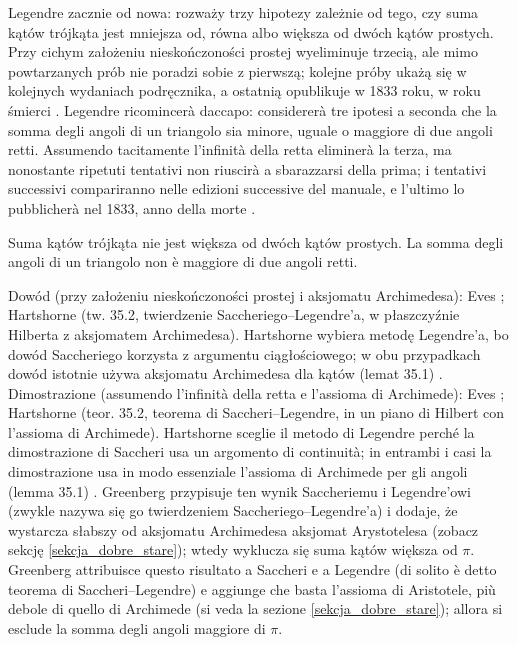 Legendre zacznie od nowa: rozważy trzy hipotezy zależnie od tego, czy suma kątów trójkąta jest mniejsza od, równa albo większa od dwóch kątów prostych. %
Przy cichym założeniu nieskończoności prostej wyeliminuje trzecią, ale mimo powtarzanych prób nie poradzi sobie z pierwszą; kolejne próby ukażą się w kolejnych wydaniach podręcznika, a ostatnią opublikuje w 1833 roku, w roku śmierci \cite[s. 286]{eves1_1972}. %
Legendre ricomincerà daccapo: considererà tre ipotesi a seconda che la somma degli angoli di un triangolo sia minore, uguale o maggiore di due angoli retti. %
Assumendo tacitamente l'infinità della retta eliminerà la terza, ma nonostante ripetuti tentativi non riuscirà a sbarazzarsi della prima; i tentativi successivi compariranno nelle edizioni successive del manuale, e l'ultimo lo pubblicherà nel 1833, anno della morte \cite[p. 286]{eves1_1972}. %

\begin{theorem}
[pierwsze twierdzenie Legendre'a] %
[primo teorema di Legendre] %
	Suma kątów trójkąta nie jest większa od dwóch kątów prostych. %
	La somma degli angoli di un triangolo non è maggiore di due angoli retti. %
\end{theorem}

Dowód (przy założeniu nieskończoności prostej i aksjomatu Archimedesa): Eves \cite[s. 290, zad. 11]{eves1_1972}; Hartshorne \cite[s. 320--321]{hartshorne_2000} (tw. 35.2, twierdzenie Saccheriego--Legendre'a, w płaszczyźnie Hilberta z aksjomatem Archimedesa). %
Hartshorne wybiera metodę Legendre'a, bo dowód Saccheriego korzysta z argumentu ciągłościowego; w obu przypadkach dowód istotnie używa aksjomatu Archimedesa dla kątów (lemat 35.1) \cite[s. 319]{hartshorne_2000}. %
Dimostrazione (assumendo l'infinità della retta e l'assioma di Archimede): Eves \cite[p. 290, es. 11]{eves1_1972}; Hartshorne \cite[p. 320--321]{hartshorne_2000} (teor. 35.2, teorema di Saccheri--Legendre, in un piano di Hilbert con l'assioma di Archimede). %
Hartshorne sceglie il metodo di Legendre perché la dimostrazione di Saccheri usa un argomento di continuità; in entrambi i casi la dimostrazione usa in modo essenziale l'assioma di Archimede per gli angoli (lemma 35.1) \cite[p. 319]{hartshorne_2000}. %
Greenberg \cite[s. 206, 209]{greenberg_2010} przypisuje ten wynik Saccheriemu i Legendre'owi (zwykle nazywa się go twierdzeniem Saccheriego--Legendre'a) i dodaje, że wystarcza słabszy od aksjomatu Archimedesa aksjomat Arystotelesa (zobacz sekcję \ref{sekcja_dobre_stare}); wtedy wyklucza się suma kątów większa od $\pi$. %
Greenberg \cite[p. 206, 209]{greenberg_2010} attribuisce questo risultato a Saccheri e a Legendre (di solito è detto teorema di Saccheri--Legendre) e aggiunge che basta l'assioma di Aristotele, più debole di quello di Archimede (si veda la sezione \ref{sekcja_dobre_stare}); allora si esclude la somma degli angoli maggiore di $\pi$. %

